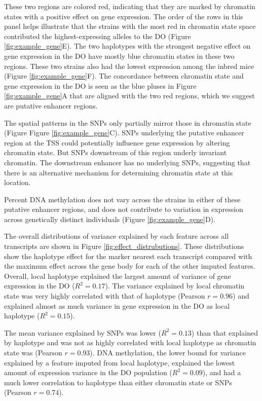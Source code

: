 \documentclass[10pt,letterpaper]{article}
\begin{document}
These two regions are colored red, indicating that they are marked by
chromatin states with a positive effect on gene expression. The order of
the rows in this panel helps illustrate that the strains with the most
red in chromatin state space contributed the highest-expressing alleles
to the DO (Figure \ref{fig:example_gene}E). The two haplotypes with the
strongest negative effect on gene expression in the DO have mostly blue
chromatin states in these two regions. These two strains also had the
lowest expression among the inbred mice (Figure
\ref{fig:example_gene}F). The concordance between chromatin state and
gene expression in the DO is seen as the blue pluses in Figure
\ref{fig:example_gene}A that are aligned with the two red regions, which
we suggest are putative enhancer regions.

The spatial patterns in the SNPs only partially mirror those in
chromatin state (Figure Figure \ref{fig:example_gene}C). SNPs underlying
the putative enhancer region at the TSS could potentially influence gene
expression by altering chromatin state. But SNPs downstream of this
region underly invariant chromatin. The downstream enhancer has no
underlying SNPs, suggesting that there is an alternative mechanism for
determining chromatin state at this location.

Percent DNA methylation does not vary across the strains in either of
these putative enhancer regions, and does not contribute to variation in
expression across genetically distinct individuals (Figure
\ref{fig:example_gene}D).

The overall distributions of variance explained by each feature across
all transcripts are shown in Figure \ref{fig:effect_distrubutions}.
These distributions show the haplotype effect for the marker nearest
each transcript compared with the maximum effect across the gene body
for each of the other imputed features. Overall, local haplotype
explained the largest amount of variance of gene expression in the DO
(\(R^2 = 0.17\)). The variance explained by local chromatin state was
very highly correlated with that of haplotype (Pearson \(r = 0.96\)) and
explained almost as much variance in gene expression in the DO as local
haplotype (\(R^2 = 0.15\)).

The mean variance explained by SNPs was lower (\(R^2 = 0.13\)) than that
explained by haplotype and was not as highly correlated with local
haplotype as chromatin state was (Pearson \(r = 0.93\)). DNA
methylation, the lower bound for variance explained by a feature imputed
from local haplotype, explained the lowest amount of expression variance
in the DO population (\(R^2 = 0.09\)), and had a much lower correlation
to haplotype than either chromatin state or SNPs (Pearson \(r = 0.74\)).
\end{document}
